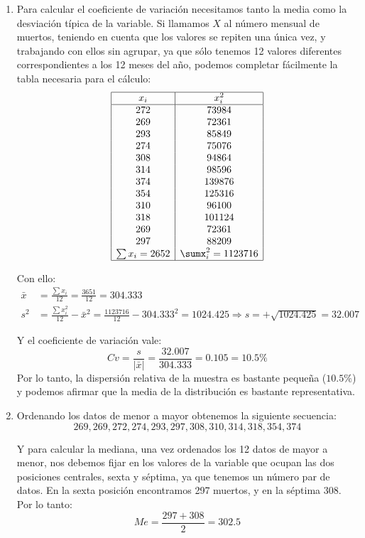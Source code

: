 {\begin{enumerate}
\item Para calcular el coeficiente de variación necesitamos tanto la media como la desviación típica de la variable. Si llamamos $X$ al número mensual de muertos, teniendo en cuenta que los valores se repiten una única vez, y trabajando con ellos sin agrupar, ya que sólo tenemos 12 valores diferentes correspondientes a los 12 meses
del año, podemos completar fácilmente la tabla necesaria para el cálculo:
\[
\begin{array}{|c|c|}
\hline
x_i & x_i^2 \\
\hline
272 & 73984 \\
269 & 72361 \\
293 & 85849 \\
274 & 75076 \\
308 & 94864 \\
314 & 98596 \\
374 & 139876 \\
354 & 125316 \\
310 & 96100 \\
318 & 101124 \\
269 & 72361 \\
297 & 88209 \\
\sum x_i=2652 & \sumx_i^2=1123716 \\
\hline
\end{array}
\]

Con ello:
\begin{align*}
\bar x &= \frac{{\sum {x_i} }} {12} = \frac{{3651}} {{12}} = 304.333\\
s^2  &= \frac{{\sum {x_i ^2} }} {12} - \bar x^2 = \frac{{1123716}}
{{12}} - 304.333^2  = 1024.425 \Rightarrow s = + \sqrt {1024.425} =
32.007
\end{align*}

Y el coeficiente de variación vale:
\[
Cv = \frac{s}{{\left| {\bar x} \right|}} =
\frac{{32.007}}{{304.333}} = 0.105=10.5\%
\]
Por lo tanto, la dispersión relativa de la muestra es bastante pequeña ($10.5\%$) y podemos afirmar que la media de la distribución es bastante representativa.

\item Ordenando los datos de menor a mayor obtenemos la siguiente secuencia:
\[
269,269,272,274,293,297,308,310,314,318,354,374
\]

Y para calcular la mediana, una vez ordenados los 12 datos de mayor a menor, nos debemos fijar en los valores de la variable que ocupan las dos posiciones centrales, sexta y séptima, ya que tenemos un número par de datos. En la sexta posición encontramos 297 muertos, y en la séptima 308. Por lo tanto:
\[
Me = \frac{{297 + 308}}{2} = 302.5
\]
\end{enumerate}
}


